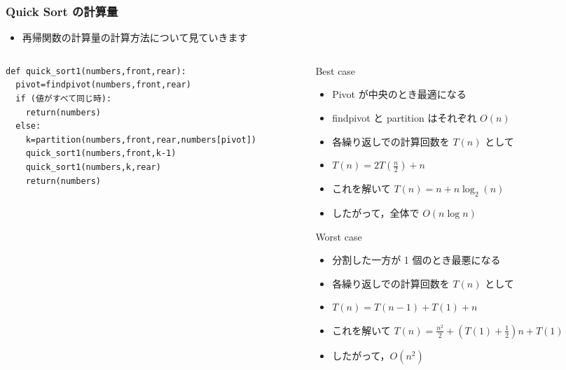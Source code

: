 \begin{frame}
\frametitle{Quick Sort の計算量}
  \begin{itemize}
\item 再帰関数の計算量の計算方法について見ていきます
  \end{itemize}
  \begin{columns}[t,onlytextwidth]
    \begin{column}{0.45\linewidth}
      \begin{lstlisting}[caption={擬似コード},label=insertion_sort]
def quick_sort1(numbers,front,rear):
  pivot=findpivot(numbers,front,rear)
  if (値がすべて同じ時):
    return(numbers)
  else:
    k=partition(numbers,front,rear,numbers[pivot])
    quick_sort1(numbers,front,k-1)
    quick_sort1(numbers,k,rear)
    return(numbers)
      \end{lstlisting}
    \end{column}
    \begin{column}{0.5\linewidth}
      \begin{itembox}[l]{Best case}
        \begin{itemize}
\tiny
\item Pivot が中央のとき最適になる
\item findpivot と partition はそれぞれ $O(n)$
\item 各繰り返しでの計算回数を \(T(n)\) として
\item \(T(n)=2T(\frac{n}{2})+n\)
\item これを解いて \(T(n)=n+n\log_2(n)\)
\item したがって，全体で \(O(n\log n)\) 
        \end{itemize}
      \end{itembox}
      \begin{itembox}[l]{Worst case}
        \begin{itemize}
\tiny
\item 分割した一方が 1 個のとき最悪になる
\item 各繰り返しでの計算回数を \(T(n)\) として
\item \(T(n)=T(n-1)+T(1)+n\)
\item これを解いて \(T(n)=\frac{n^2}{2}+(T(1)+\frac{1}{2})n+T(1)\)
\item したがって，\(O(n^2)\)
        \end{itemize}
      \end{itembox}
    \end{column}
  \end{columns}
\end{frame}
